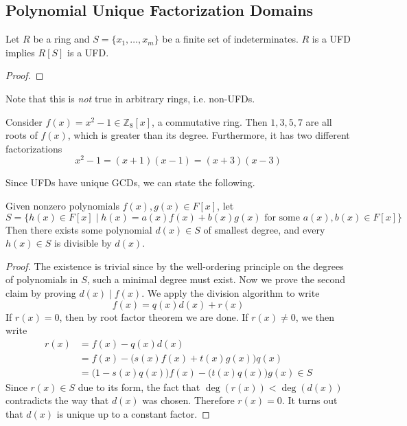\subsection{Polynomial Unique Factorization Domains}

  \begin{theorem}
    Let $R$ be a ring and $S = \{x_1, \ldots, x_m\}$ be a finite set of indeterminates. $R$ is a UFD implies $R[S]$ is a UFD. 
  \end{theorem}
  \begin{proof}
    
  \end{proof}

  Note that this is \textit{not} true in arbitrary rings, i.e. non-UFDs. 

  \begin{example}
    Consider $f(x) = x^2 - 1 \in \mathbb{Z}_8 [x]$, a commutative ring. Then $1, 3, 5, 7$ are all roots of $f(x)$, which is greater than its degree. Furthermore, it has two different factorizations 
    \begin{equation}
      x^2 - 1 = (x + 1)(x - 1) = (x + 3)(x - 3)
    \end{equation}
  \end{example} 

  Since UFDs have unique GCDs, we can state the following. 

  \begin{theorem}
    Given nonzero polynomials $f(x), g(x) \in F[x]$, let 
    \begin{equation}
      S = \{h(x) \in F[x] \mid h(x) = a(x) f(x) + b(x) g(x) \text{ for some } a(x), b(x) \in F[x] \}
    \end{equation} 
    Then there exists some polynomial $d(x) \in S$ of smallest degree, and every $h(x) \in S$ is divisible by $d(x)$. 
  \end{theorem}
  \begin{proof}
    The existence is trivial since by the well-ordering principle on the degrees of polynomials in $S$, such a minimal degree must exist. Now we prove the second claim by proving $d(x) \mid f(x)$. We apply the division algorithm to write 
    \begin{equation}
      f(x) = q(x) d(x) + r(x)
    \end{equation}
    If $r(x) = 0$, then by root factor theorem we are done. If $r(x) \neq 0$, we then write 
    \begin{align}
      r(x) & = f(x) - q(x) d(x) \\ 
           & = f(x) - \big( s(x) f(x) + t(x) g(x) \big) q(x) \\ 
           & = \big( 1 - s(x) q(x) \big) f(x) - \big( t(x) q(x) \big) g(x) \in S
    \end{align}
    Since $r(x) \in S$ due to its form, the fact that $\deg(r(x)) < \deg(d(x))$ contradicts the way that $d(x)$ was chosen. Therefore $r(x) = 0$. It turns out that $d(x)$ is unique up to a constant factor. 
  \end{proof}

